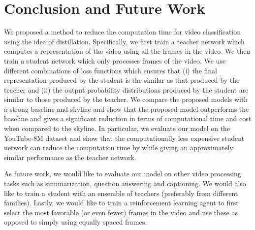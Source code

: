 \documentclass[10pt,twocolumn,letterpaper]{article}
\begin{document}
\section{Conclusion and Future Work}
We proposed a method to reduce the computation time for video classification using the idea of distillation. Specifically, we first train a teacher network which computes a representation of the video using all the frames in the video. We then train a student network which only processes  frames of the video. We use different combinations of loss functions which ensures that (i) the final representation produced by the student is the similar as that produced by the teacher and (ii) the output probability distributions produced by the student are similar to those produced by the teacher. We compare the proposed models with a strong baseline and skyline and show that the proposed model outperforms the baseline and gives a significant reduction in terms of computational time and cost when compared to the skyline.
In particular, we evaluate our model on the YouTube-8M dataset and show that the computationally less expensive student network can reduce the computation time by  while giving an approximately similar performance as the teacher network. 

As future work, we would like to evaluate our model on other video processing tasks such as summarization, question answering and captioning. We would also like to train a student with an ensemble of teachers (preferably from different families). Lastly, we would like to train a reinforcement learning agent to first select the most favorable  (or even fewer) frames in the video and use these as opposed to simply using equally spaced  frames.

\begin{comment}
\begin{tabular}{c|c|c}
\toprule
\textsc{Model}    & Student-Loss& CosSim\\
Serial &  &   0 \\
\midrule
Serial & , &   0 \\
\midrule
Serial & ,, &   0 \\
\bottomrule
\end{tabular}
\end{comment}

{\small


}
\end{document}
